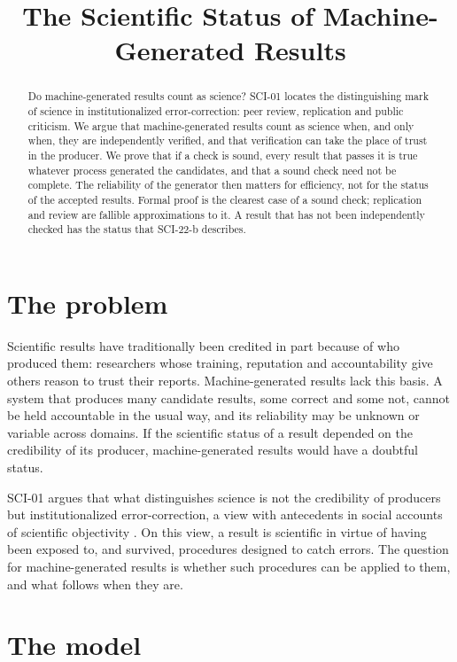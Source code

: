 \documentclass{situationist-preprint}
\title{The Scientific Status of Machine-Generated Results}
\begin{document}
\maketitle

\begin{abstract}
Do machine-generated results count as science? SCI-01 locates the distinguishing mark of science in institutionalized error-correction: peer review, replication and public criticism. We argue that machine-generated results count as science when, and only when, they are independently verified, and that verification can take the place of trust in the producer. We prove that if a check is sound, every result that passes it is true whatever process generated the candidates, and that a sound check need not be complete. The reliability of the generator then matters for efficiency, not for the status of the accepted results. Formal proof is the clearest case of a sound check; replication and review are fallible approximations to it. A result that has not been independently checked has the status that SCI-22-b describes.
\end{abstract}

\section{The problem}

Scientific results have traditionally been credited in part because of who produced them: researchers whose training, reputation and accountability give others reason to trust their reports. Machine-generated results lack this basis. A system that produces many candidate results, some correct and some not, cannot be held accountable in the usual way, and its reliability may be unknown or variable across domains. If the scientific status of a result depended on the credibility of its producer, machine-generated results would have a doubtful status.

SCI-01 argues that what distinguishes science is not the credibility of producers but institutionalized error-correction, a view with antecedents in social accounts of scientific objectivity \citep{Longino1990}. On this view, a result is scientific in virtue of having been exposed to, and survived, procedures designed to catch errors. The question for machine-generated results is whether such procedures can be applied to them, and what follows when they are.

\section{The model}
\end{document}
